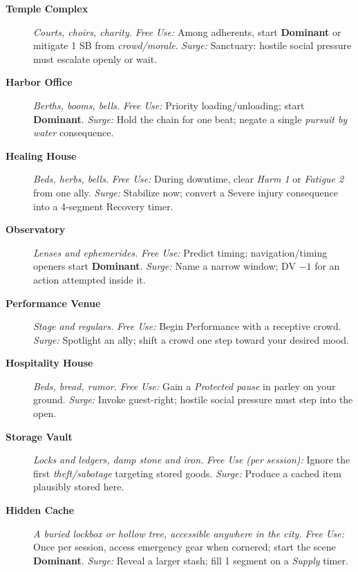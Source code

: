 \begin{description}
  \item[\textbf{Temple Complex}]  \emph{Courts, choirs, charity.} \emph{Free Use:} Among adherents, start \textbf{Dominant} or mitigate 1 SB from \emph{crowd/morale}. \emph{Surge:} Sanctuary: hostile social pressure must escalate openly or wait.

  \item[\textbf{Harbor Office}]  \emph{Berths, booms, bells.} \emph{Free Use:} Priority loading/unloading; start \textbf{Dominant}. \emph{Surge:} Hold the chain for one beat; negate a single \emph{pursuit by water} consequence.

  \item[\textbf{Healing House}]  \emph{Beds, herbs, bells.} \emph{Free Use:} During downtime, clear \emph{Harm 1} or \emph{Fatigue 2} from one ally. \emph{Surge:} Stabilize now; convert a Severe injury consequence into a 4‑segment Recovery timer.

  \item[\textbf{Observatory}]  \emph{Lenses and ephemerides.} \emph{Free Use:} Predict timing; navigation/timing openers start \textbf{Dominant}. \emph{Surge:} Name a narrow window; DV $-1$ for an action attempted inside it.

  \item[\textbf{Performance Venue}]  \emph{Stage and regulars.} \emph{Free Use:} Begin Performance with a receptive crowd. \emph{Surge:} Spotlight an ally; shift a crowd one step toward your desired mood.

  \item[\textbf{Hospitality House}]  \emph{Beds, bread, rumor.} \emph{Free Use:} Gain a \emph{Protected pause} in parley on your ground. \emph{Surge:} Invoke guest-right; hostile social pressure must step into the open.

  \item[\textbf{Storage Vault}]  \emph{Locks and ledgers, damp stone and iron.} \emph{Free Use (per session):} Ignore the first \emph{theft/sabotage} targeting stored goods. \emph{Surge:} Produce a cached item plausibly stored here.

  \item[\textbf{Hidden Cache}]  \emph{A buried lockbox or hollow tree, accessible anywhere in the city.} \emph{Free Use:} Once per session, access emergency gear when cornered; start the scene \textbf{Dominant}. \emph{Surge:} Reveal a larger stash; fill 1 segment on a \emph{Supply} timer.


\end{description}
